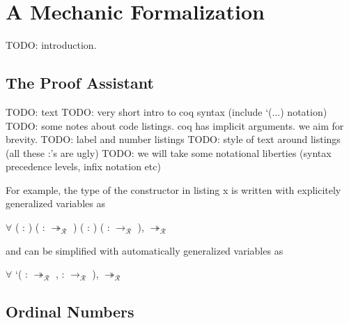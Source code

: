 \chapter{A Mechanic Formalization}\label{chap:implementation}

TODO: introduction.


\section{The \Coq Proof Assistant}

TODO: text
TODO: very short intro to coq syntax (include `(...) notation)
TODO: some notes about code listings. coq has implicit arguments. we aim for
brevity.
TODO: label and number listings
TODO: style of text around listings (all these :'s are ugly)
TODO: we will take some notational liberties (syntax precedence levels, infix
notation etc)

For example, the type of the  constructor in listing x
is written with explicitely generalized variables as
\begin{singlespace}
\begin{coqdoccode}
\coqdocnoindent
\ensuremath{\forall} (  :
) (\coqdocvar{$\rho$}
:  $\twoheadrightarrow_\mathcal{R}$ )
( : )
(\coqdocvar{$\pi$} : 
$\rightarrow_\mathcal{R}$ ),
 $\twoheadrightarrow_\mathcal{R}$
\coqdoceol
\end{coqdoccode}
\end{singlespace}
and can be simplified with automatically generalized variables as
\begin{singlespace}
\begin{coqdoccode}
\coqdocnoindent
\ensuremath{\forall} `(\coqdocvar{$\rho$} : 
$\twoheadrightarrow_\mathcal{R}$ ,
\coqdocvar{$\pi$} :  $\rightarrow_\mathcal{R}$ ),
 $\twoheadrightarrow_\mathcal{R}$
\coqdoceol
\end{coqdoccode}
\end{singlespace}


\section{Ordinal Numbers}

